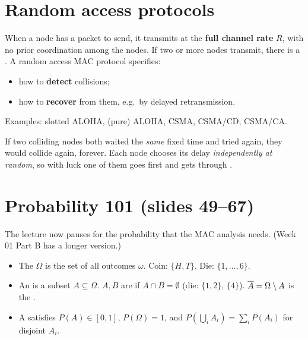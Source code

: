 \section{Random access protocols}

\begin{defn}
When a node has a packet to send, it transmits at the \textbf{full channel rate} $R$, with no prior coordination among the nodes.
If two or more nodes transmit, there is a . A random access MAC protocol specifies:
\begin{itemize}
  \item how to \textbf{detect} collisions;
  \item how to \textbf{recover} from them, e.g.\ by delayed retransmission.
\end{itemize}
Examples: slotted ALOHA, (pure) ALOHA, CSMA, CSMA/CD, CSMA/CA.
\end{defn}

\begin{intuition}
If two colliding nodes both waited the \emph{same} fixed time and tried again, they would collide again, forever. Each node chooses its delay
\emph{independently at random}, so with luck one of them goes first and gets through .
\end{intuition}

\section{Probability 101 (slides 49--67)}

The lecture now pauses for the probability that the MAC analysis needs. (Week 01 Part B has a longer version.)

\begin{defn}
\begin{itemize}
  \item The  $\Omega$ is the set of all outcomes $\omega$. Coin: $\{H,T\}$. Die: $\{1,\dots,6\}$.
  \item An  is a subset $A\subseteq\Omega$. $A,B$ are  if $A\cap B=\emptyset$ (die: $\{1,2\}$, $\{4\}$). $\overline{A}=\Omega\setminus A$ is the .
  \item A  satisfies $P(A)\in[0,1]$, $P(\Omega)=1$, and $P(\bigcup_iA_i)=\sum_iP(A_i)$ for disjoint $A_i$.
\end{itemize}
\end{defn}

